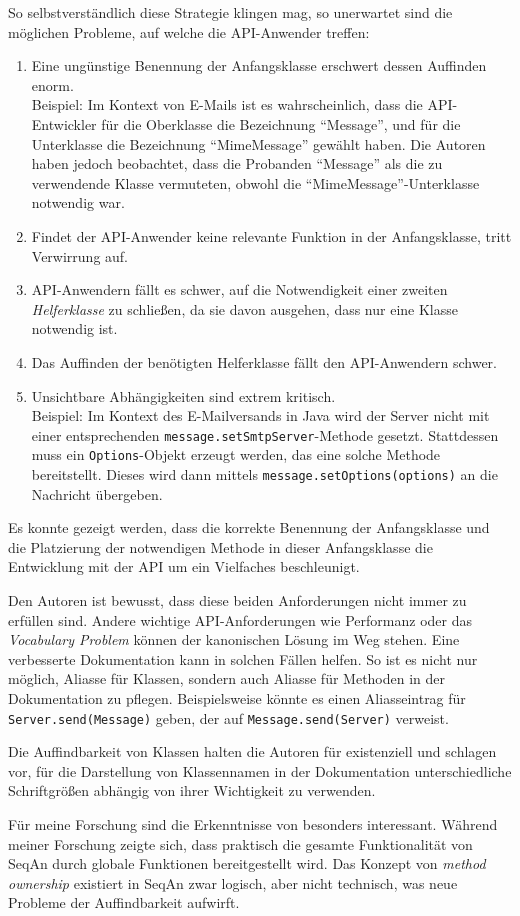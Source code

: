 \begin{important}
So selbstverständlich diese Strategie klingen mag, so unerwartet sind die möglichen Probleme, auf welche die API-Anwender treffen:
\begin{enumerate}
  \item Eine ungünstige Benennung der Anfangsklasse erschwert dessen Auffinden enorm.
  \\Beispiel: Im Kontext von E-Mails ist es wahrscheinlich, dass die API-Entwickler für die Oberklasse die Bezeichnung ``Message'', und für die Unterklasse die Bezeichnung ``MimeMessage'' gewählt haben. Die Autoren haben jedoch beobachtet, dass die Probanden ``Message'' als die zu verwendende Klasse vermuteten, obwohl die ``MimeMessage''-Unterklasse notwendig war.
  \item Findet der API-Anwender keine relevante Funktion in der Anfangsklasse, tritt Verwirrung auf.
  \item API-Anwendern fällt es schwer, auf die Notwendigkeit einer zweiten \textit{Helferklasse} zu schließen, da sie davon ausgehen, dass nur eine Klasse notwendig ist.
  \item Das Auffinden der benötigten Helferklasse fällt den API-Anwendern schwer.
  \item Unsichtbare Abhängigkeiten sind extrem kritisch.
  \\Beispiel: Im Kontext des E-Mailversands in Java wird der Server nicht mit einer entsprechenden \texttt{message.setSmtpServer}-Methode gesetzt. Stattdessen muss ein \texttt{Options}-Objekt erzeugt werden, das eine solche Methode bereitstellt. Dieses wird dann mittels \texttt{message.setOptions(options)} an die Nachricht übergeben.
\end{enumerate}

Es konnte gezeigt werden, dass die korrekte Benennung der Anfangsklasse und die Platzierung der notwendigen Methode in dieser Anfangsklasse die Entwicklung mit der API um ein Vielfaches beschleunigt.

Den Autoren ist bewusst, dass diese beiden Anforderungen nicht immer zu erfüllen sind. Andere wichtige API-Anforderungen wie Performanz oder das \textit{Vocabulary Problem}\citep{Furnas:1987hl} können der kanonischen Lösung im Weg stehen. Eine verbesserte Dokumentation kann in solchen Fällen helfen. So ist es nicht nur möglich, Aliasse für Klassen, sondern auch Aliasse für Methoden in der Dokumentation zu pflegen. Beispielsweise könnte es einen Aliasseintrag für \texttt{Server.send(Message)} geben, der auf \texttt{Message.send(Server)} verweist.

Die Auffindbarkeit von Klassen halten die Autoren für existenziell und schlagen vor, für die Darstellung von Klassennamen in der Dokumentation unterschiedliche Schriftgrößen abhängig von ihrer Wichtigkeit zu verwenden.

Für meine Forschung sind die Erkenntnisse von \cite{Stylos:2008jt} besonders interessant. Während meiner Forschung zeigte sich, dass praktisch die gesamte Funktionalität von SeqAn durch globale Funktionen bereitgestellt wird. Das Konzept von \textit{method ownership} existiert in SeqAn zwar logisch, aber nicht technisch, was neue Probleme der Auffindbarkeit aufwirft.
\end{important}